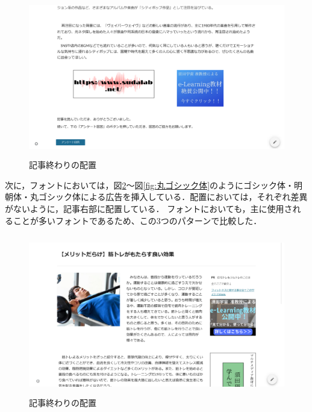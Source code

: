 \documentclass[12pt,a4j,titlepage]{ltjsarticle}
\begin{document}
\begin{figure}[H]
\begin{center}
 \includegraphics[height=70mm]{figures/記事終わり.pdf}
\end{center}
 \caption{記事終わりの配置}
 \label{fig:記事終わり}
\end{figure}

次に，フォントにおいては，図\ref{fig:ゴシック体}～図\ref{fig:丸ゴシック体}のようにゴシック体・明朝体・丸ゴシック体による広告を挿入している．配置においては，それぞれ差異がないように，記事右部に配置している．
フォントにおいても，主に使用されることが多いフォントであるため、この3つのパターンで比較した．

\begin{figure}[H]
\begin{center}
 \includegraphics[height=70mm]{figures/ゴシック体.pdf}
\end{center}
 \caption{記事終わりの配置}
 \label{fig:ゴシック体}
\end{figure}
\end{document}
